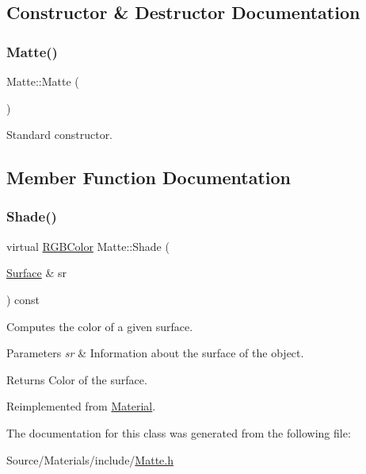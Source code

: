 \subsection{Constructor \& Destructor Documentation}
\hypertarget{class_matte_a1f460cbc9dd811c509ca50b652102ac2}{}\label{class_matte_a1f460cbc9dd811c509ca50b652102ac2} 
\subsubsection{\texorpdfstring{Matte()}{Matte()}}
{\footnotesize\ttfamily Matte\+::\+Matte (\begin{DoxyParamCaption}{ }\end{DoxyParamCaption})}

Standard constructor. 

\subsection{Member Function Documentation}
\hypertarget{class_matte_a1313aabd946d45ec67a9de4fbc486f6c}{}\label{class_matte_a1313aabd946d45ec67a9de4fbc486f6c} 
\subsubsection{\texorpdfstring{Shade()}{Shade()}}
{\footnotesize\ttfamily virtual \hyperlink{class_r_g_b_color}{R\+G\+B\+Color} Matte\+::\+Shade (\begin{DoxyParamCaption}\item[{\hyperlink{class_surface}{Surface} \&}]{sr }\end{DoxyParamCaption}) const\hspace{0.3cm}{\ttfamily [virtual]}}

Computes the color of a given surface. 
\begin{DoxyParams}{Parameters}
{\em sr} & Information about the surface of the object. \\
\hline
\end{DoxyParams}
\begin{DoxyReturn}{Returns}
Color of the surface. 
\end{DoxyReturn}


Reimplemented from \hyperlink{class_material_aeccd880ee7b86a849e8f2d2f0bcf4fc7}{Material}.



The documentation for this class was generated from the following file\+:\begin{DoxyCompactItemize}
\item 
Source/\+Materials/include/\hyperlink{_matte_8h}{Matte.\+h}\end{DoxyCompactItemize}
